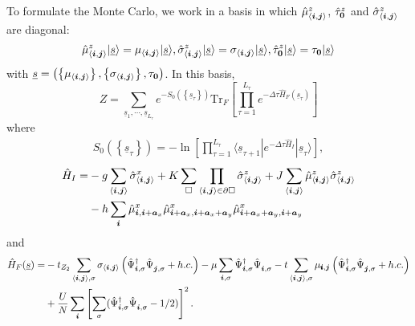 To formulate the Monte Carlo, we work in a basis in which  $\hat{\mu}^{z}_{ \langle  \boldsymbol{i}, \boldsymbol{j} \rangle }$,  $ \hat{\tau}^{z}_{   \boldsymbol{0} } $  and  $ \hat{\sigma}^{z}_{ \langle  \boldsymbol{i}, \boldsymbol{j} \rangle }$    are diagonal: 
\begin{align}
	  \hat{\mu}^{z}_{ \langle  \boldsymbol{i}, \boldsymbol{j} \rangle } |  \underline{s} \rangle  =  \mu_{ \langle  \boldsymbol{i}, \boldsymbol{j} \rangle }   |  \underline{s} \rangle, 
	 \hat{\sigma}^{z}_{ \langle  \boldsymbol{i}, \boldsymbol{j} \rangle }|  \underline{s} \rangle  =  \sigma_{ \langle  \boldsymbol{i}, \boldsymbol{j} \rangle } |  \underline{s} \rangle,    
	  \hat{\tau}^{z}_{   \boldsymbol{0} }  |  \underline{s} \rangle   =  \tau_{  \boldsymbol{0} } |  \underline{s} \rangle
\end{align}
with $ \underline{s} = \left( \left\{  \mu_{ \langle  \boldsymbol{i}, \boldsymbol{j} \rangle }  \right\},  \left\{  \sigma_{ \langle  \boldsymbol{i}, \boldsymbol{j} \rangle }  \right\},  \tau_{\boldsymbol{0}}  \right) $. 
In this basis,
\begin{equation}
   Z  =  \sum_{\underline {s}_1, \cdots, \underline {s}_{L_{\tau}}}  e^{-S_0( \left\{ \underline{s}_\tau \right\})} \text{Tr}_F   \left[    \prod_{\tau=1}^{L_{\tau}} e^{- \Delta \tau \hat{H}_F(\underline{s}_{\tau}) } \right]
 \end{equation}
 where 
 \begin{align*}
 	 S_0( \left\{ \underline{s}_\tau \right\})  = - \ln  \left[  \prod_{\tau=1}^{L_{\tau}}    \langle \underline{s}_{\tau+1}   |  e^{-\Delta \tau   \hat{H}_I} |  \underline{s}_{\tau}  \rangle  \right], 
\end{align*}
\begin{align*}
         \hat{H}_I  = &  -g \sum_{\langle \boldsymbol{i}, \boldsymbol{j} \rangle } \hat{\sigma}^{x}_{\langle \boldsymbol{i}, \boldsymbol{j} \rangle }  +
	                        K \sum_{\square} \prod_{\langle \boldsymbol{i}, \boldsymbol{j} \rangle \in \partial \square} \hat{\sigma}^{z}_{\langle \boldsymbol{i}, \boldsymbol{j} \rangle}  
	     + J  \sum_{\langle \boldsymbol{i}, \boldsymbol{j} \rangle}  \hat{\mu}^z_{ \langle \pmb{i}, \boldsymbol{j} \rangle }  \hat{\sigma}^{z}_{\langle \boldsymbol{i}, \boldsymbol{j} \rangle}     \\
	     & -  h \sum_{ \boldsymbol{i} } \hat{\mu}^{x}_{\boldsymbol{i},\boldsymbol{i} + \boldsymbol{a}_x } \hat{\mu}^{x}_{\boldsymbol{i} + \boldsymbol{a}_x, \boldsymbol{i} + \boldsymbol{a}_x + \boldsymbol{a}_y }   \hat{\mu}^{x}_{\boldsymbol{i} + \boldsymbol{a}_x + \boldsymbol{a}_y, \boldsymbol{i} + \boldsymbol{a}_y}  	
\end{align*}
and 
 \begin{align*}
   \hat{H}_F(\underline{s})  = 
   	     & -  t_{Z_2} \sum_{\langle \vec{i}, \vec{j} \rangle, \sigma } \sigma_{\langle \vec{i}, \vec{j} \rangle}
	\left(\hat{\Psi}^{\dagger}_{\vec{i},\sigma} \hat{\Psi}^{\phantom{\dagger}}_{\vec{j},\sigma}   + h.c. \right) - \mu \sum_{\vec{i},\sigma} \hat{\Psi}^{\dagger}_{\vec{i},\sigma} \hat{\Psi}^{\phantom{\dagger}}_{\vec{i},\sigma}     
         - t  \sum_{\langle \vec{i}, \vec{j} \rangle, \sigma }   \mu_{\pmb{i},\ve{j}}    \left( \hat{\Psi}^{\dagger}_{\vec{i},\sigma} \hat{\Psi}^{\phantom{\dagger}}_{\vec{j},\sigma} 	+ h.c. \right)  
         \\
         & +\frac{U}{N}\sum_{\ve{i}} \left[ \sum_{\sigma}  ( \hat{\Psi}^{\dagger}_{\ve{i},\sigma}  \hat{\Psi}^{\phantom\dagger}_{\ve{i},\sigma} - 1/2 ) \right]^2. 
 \end{align*}
